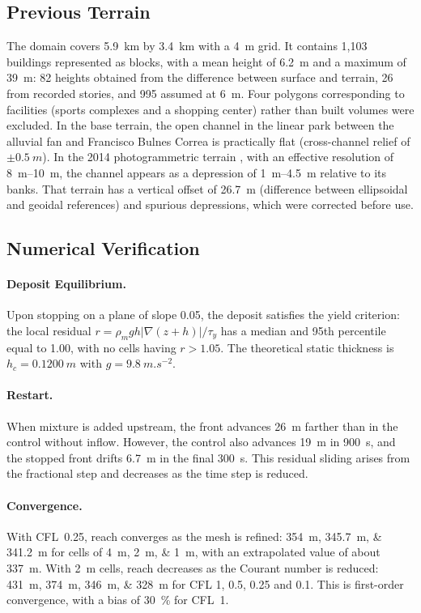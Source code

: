 \subsection{Previous Terrain}\label{sec:res-terreno}
The domain covers \SI{5.9}{km} by \SI{3.4}{km} with a \SI{4}{m} grid. It contains 1,103 buildings represented as blocks, with a mean height of \SI{6.2}{m} and a maximum of \SI{39}{m}: 82 heights obtained from the difference between surface and terrain, 26 from recorded stories, and 995 assumed at \SI{6}{m}. Four polygons corresponding to facilities (sports complexes and a shopping center) rather than built volumes were excluded. In the base terrain, the open channel in the linear park between the alluvial fan and Francisco Bulnes Correa is practically flat (cross-channel relief of $\pm\SI{0.5}{m}$). In the 2014 photogrammetric terrain \citep{hussain2021}, with an effective resolution of \SIrange{8}{10}{m}, the channel appears as a depression of \SIrange{1}{4.5}{m} relative to its banks. That terrain has a vertical offset of \SI{26.7}{m} (difference between ellipsoidal and geoidal references) and spurious depressions, which were corrected before use.

\subsection{Numerical Verification}\label{sec:res-verif}
\paragraph{Deposit Equilibrium.} Upon stopping on a plane of slope 0.05, the deposit satisfies the yield criterion: the local residual $r=\rho_m g h|\nabla(z+h)|/\tau_y$ has a median and 95th percentile equal to 1.00, with no cells having $r>1.05$. The theoretical static thickness is $h_c=\SI{0.1200}{m}$ with $g=\SI{9.8}{m.s^{-2}}$.
\paragraph{Restart.} When mixture is added upstream, the front advances \SI{26}{m} farther than in the control without inflow. However, the control also advances \SI{19}{m} in \SI{900}{s}, and the stopped front drifts \SI{6.7}{m} in the final \SI{300}{s}. This residual sliding arises from the fractional step and decreases as the time step is reduced.
\paragraph{Convergence.} With CFL~0.25, reach converges as the mesh is refined: \SIlist{354;345.7;341.2}{m} for cells of \SIlist{4;2;1}{m}, with an extrapolated value of about \SI{337}{m}. With \SI{2}{m} cells, reach decreases as the Courant number is reduced: \SIlist{431;374;346;328}{m} for CFL 1, 0.5, 0.25 and 0.1. This is first-order convergence, with a bias of \SI[retain-explicit-plus=true]{+30}{\percent} for CFL~1.
